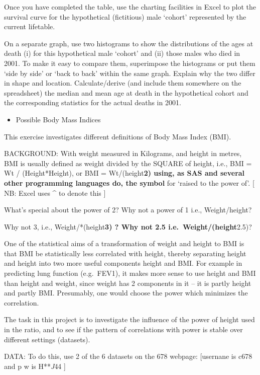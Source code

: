 \documentclass[]{book}
\providecommand{\tightlist}{%
  \setlength{\itemsep}{0pt}\setlength{\parskip}{0pt}}
\begin{document}
Once you have completed the table, use the charting facilities in Excel to plot the survival curve for the hypothetical (fictitious) male `cohort' represented by the current lifetable.

On a separate graph, use two histograms to show the distributions of the ages at death (i) for this hypothetical male `cohort' and (ii) those males who died in 2001. To make it easy to compare them, superimpose the histograms or put them `side by side' or `back to back' within the same graph. Explain why the two differ in shape and location. Calculate/derive (and include them somewhere on the spreadsheet) the median and mean age at death in the hypothetical cohort and the corresponding statistics for the actual deaths in 2001.

\begin{itemize}
\tightlist
\item
  Possible Body Mass Indices
\end{itemize}

This exercise investigates different definitions of Body Mass Index (BMI).

BACKGROUND: With weight measured in Kilograms, and height in metres, BMI is usually defined as weight divided by the SQUARE of height, i.e., BMI = Wt / (Height*Height), or BMI = Wt/(height\textbf{2) using, as SAS and several other programming languages do, the symbol } for `raised to the power of'. {[} NB: Excel uses \^{} to denote this {]}

What's special about the power of 2? Why not a power of 1 i.e., Weight/height?

Why not 3, i.e., Weight/*(height\textbf{3) ? Why not 2.5 i.e.~Weight/(height}2.5)?

One of the statistical aims of a transformation of weight and height to BMI is that BMI be statistically less correlated with height, thereby separating height and height into two more useful components height and BMI. For example in predicting lung function (e.g.~FEV1), it makes more sense to use height and BMI than height and weight, since weight has 2 components in it -- it is partly height and partly BMI. Presumably, one would choose the power which minimizes the correlation.

The task in this project is to investigate the influence of the power of height used in the ratio, and to see if the pattern of correlations with power is stable over different settings (datasets).

DATA: To do this, use 2 of the 6 datasets on the 678 webpage:
{[}usernane is c678 and p w is H**\emph{J}44 {]}
\end{document}
